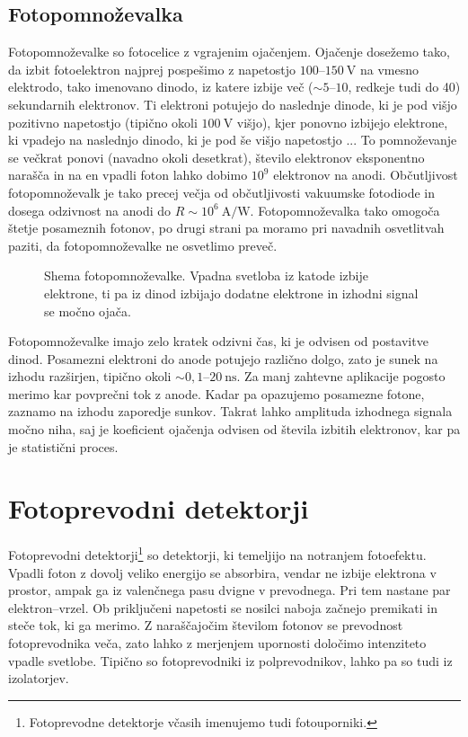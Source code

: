 \subsection*{Fotopomnoževalka}
Fotopomnoževalke so fotocelice z vgrajenim ojačenjem. Ojačenje dosežemo tako, da 
izbit fotoelektron najprej pospešimo z napetostjo $100$--$150~\si{\volt}$ na vmesno elektrodo, 
tako imenovano dinodo, iz katere izbije več ($\sim 5$--$10$, redkeje tudi do 40) 
sekundarnih elektronov. Ti elektroni
potujejo do naslednje dinode, ki je pod višjo pozitivno napetostjo (tipično okoli $100~\si{\volt}$
višjo), kjer ponovno izbijejo elektrone, ki vpadejo na naslednjo dinodo, 
ki je pod še višjo napetostjo ... 
To pomnoževanje se večkrat ponovi (navadno okoli desetkrat),
število elektronov eksponentno narašča in na en vpadli foton lahko dobimo $10^9$ elektronov na anodi. 
Občutljivost fotopomnoževalk je tako precej večja od občutljivosti vakuumske fotodiode in
dosega odzivnost na anodi do $R\sim 10^6~\si{\ampere/\watt}$.
Fotopomnoževalka tako omogoča štetje posameznih fotonov, po drugi strani pa moramo pri 
navadnih osvetlitvah paziti, da fotopomnoževalke ne osvetlimo preveč. 
\begin{figure}[h]
\centering
\def\svgwidth{80truemm} 

\caption{Shema fotopomnoževalke. Vpadna svetloba iz katode izbije elektrone, ti pa 
iz dinod izbijajo dodatne elektrone in izhodni signal se močno ojača.}
\label{fig:PMT}
\end{figure}

Fotopomnoževalke imajo zelo kratek odzivni čas, ki je odvisen od postavitve dinod. Posamezni 
elektroni do anode potujejo različno dolgo, zato je sunek na izhodu 
razširjen, tipično okoli $\sim 0,1$--$20~\si{\nano\second}$.  
Za manj zahtevne aplikacije pogosto merimo kar povprečni tok z anode. Kadar pa opazujemo
posamezne fotone, zaznamo na izhodu zaporedje sunkov. Takrat lahko 
amplituda izhodnega signala močno niha, saj je koeficient ojačenja 
odvisen od števila izbitih elektronov, kar pa je statistični proces. 

\section{Fotoprevodni detektorji}
Fotoprevodni detektorji\footnote{Fotoprevodne detektorje včasih imenujemo tudi fotouporniki.} 
so detektorji, ki temeljijo na notranjem fotoefektu.
Vpadli foton z dovolj veliko energijo se absorbira, vendar ne izbije elektrona v prostor, 
ampak ga iz valenčnega pasu dvigne v prevodnega. Pri tem nastane par elektron--vrzel. 
Ob priključeni napetosti se nosilci naboja začnejo premikati in steče tok, 
ki ga merimo. Z naraščajočim številom fotonov se prevodnost fotoprevodnika veča, 
zato lahko z merjenjem upornosti določimo 
intenziteto vpadle svetlobe. Tipično so fotoprevodniki iz polprevodnikov, 
lahko pa so tudi iz izolatorjev. 

